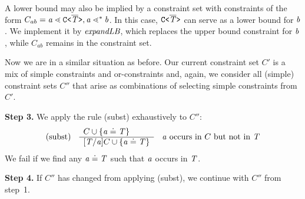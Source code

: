 A lower bound may also be implied by a constraint set with constraints of the form
$C_{ab} = \mathit{ a } \lessdot \mathtt{C \texttt{<} \overline{\mathit{T}} \texttt{>} }, \mathit{ a } \lessdot^* \mathit{ b }$. In this case, $\mathtt{C \texttt{<} \overline{\mathit{T}} \texttt{>} } $ can serve as a lower bound for
$\mathit{ b }$. We implement it by $\textit{expandLB}$, which replaces the upper bound constraint for $\mathit{ b }$, while $C_{ab}$ remains in the constraint
set.

Now we are in a similar situation as before. Our current constraint set $C'$ is a mix of simple constraints and or-constraints and, again, we
consider all (simple) constraint sets $C''$ that arise as combinations of selecting simple constraints from $C'$.

\textbf{Step 3.} We apply the rule (subst) exhaustively to $C''$:
\begin{gather*}
  \begin{array}[c]{lll}
    \text{(subst)} &
                     \begin{array}[c]{l}
                       C \cup \{ \mathit{ a } \doteq \mathit{T} \}\\
                       \hline
                       [\mathit{T}/\mathit{ a }]C \cup \{ \mathit{ a } \doteq \mathit{T} \}
                     \end{array}
                   & \mathit{ a } \text{ occurs in } C \text{ but not in } \mathit{T}
  \end{array}
\end{gather*}
We fail if we find any $\mathit{ a } \doteq \mathit{T}$ such that $\mathit{ a }$ occurs in $\mathit{T}$.

\textbf{Step 4.} If $C''$ has changed from applying (subst), we continue with $C''$ from step~1.

